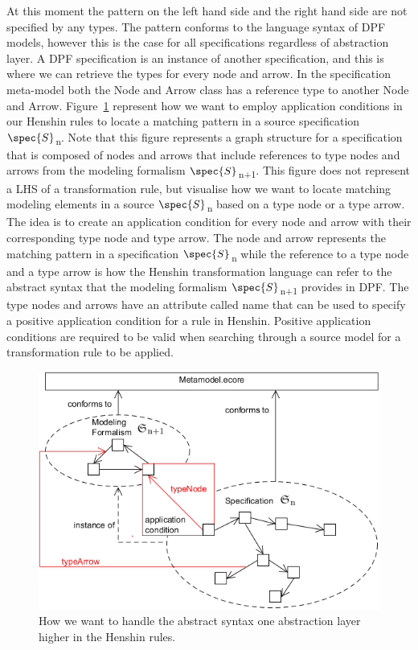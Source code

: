 At this moment the pattern on the left hand side and the right hand side
are not specified by any types. The pattern conforms to the language syntax of
DPF models, however this is the case for all specifications regardless of
abstraction layer. A DPF specification is an instance of another
specification, and this is where we can retrieve the types for every node and
arrow. In the specification meta-model both the Node and Arrow class has a
reference type to another Node and Arrow. Figure~\ref{fig:pac_henshin}
represent how we want to employ application conditions in our Henshin rules to
locate a matching pattern in a source specification
$\spec{S}$\textsubscript{n}. Note that this figure represents a graph
structure for a specification that is composed of nodes and arrows that include
references to type nodes and arrows from the modeling formalism
$\spec{S}$\textsubscript{n+1}. This figure does not represent a LHS of a
transformation rule, but visualise how we want to locate matching modeling
elements in a source $\spec{S}$\textsubscript{n} based on a type node or a type
arrow. The idea is to create an application condition for every node and arrow
with their corresponding type node and type arrow. The node and arrow represents
the matching pattern in a specification $\spec{S}$\textsubscript{n} while the
reference to a type node and a type arrow is how the Henshin transformation
language can refer to the abstract syntax that the modeling formalism
$\spec{S}$\textsubscript{n+1} provides in DPF. The type nodes and arrows have
an attribute called name that can be used to specify a positive application
condition for a rule in Henshin. Positive application conditions are required
to be valid when searching through a source model for a transformation rule to
be applied.

\begin{figure}[H] 
	\centering
	\includegraphics[scale=0.7]{./Figures/metamodelSpecification_PAC_1.png}
	\caption[How we want to handled types for a DPF model]
	{How we want to handle the abstract syntax one abstraction layer higher in
	the Henshin rules.}
	\label{fig:pac_henshin}
\end{figure}

